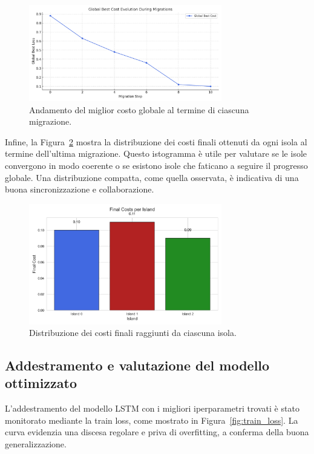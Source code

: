 \documentclass{article}
\begin{document}
\begin{figure}[H]
    \centering
    \includegraphics[width=0.75\textwidth]{img/global_best_cost_per_migration.png}
    \caption{Andamento del miglior costo globale al termine di ciascuna migrazione.}
    \label{fig:global_cost}
\end{figure}

Infine, la Figura~\ref{fig:final_costs_hist} mostra la distribuzione dei costi finali ottenuti da ogni isola al 
termine dell’ultima migrazione. Questo istogramma è utile per valutare se le isole convergono in modo coerente o 
se esistono isole che faticano a seguire il progresso globale. Una distribuzione compatta, come quella osservata, 
è indicativa di una buona sincronizzazione e collaborazione.

\begin{figure}[H]
    \centering
    \includegraphics[width=0.75\textwidth]{img/final_costs_per_island.png}
    \caption{Distribuzione dei costi finali raggiunti da ciascuna isola.}
    \label{fig:final_costs_hist}
\end{figure}

\subsection*{Addestramento e valutazione del modello ottimizzato}

L'addestramento del modello LSTM con i migliori iperparametri trovati è stato monitorato mediante la train loss, 
come mostrato in Figura~\ref{fig:train_loss}. 
La curva evidenzia una discesa regolare e priva di overfitting, a conferma della buona generalizzazione.
\end{document}
